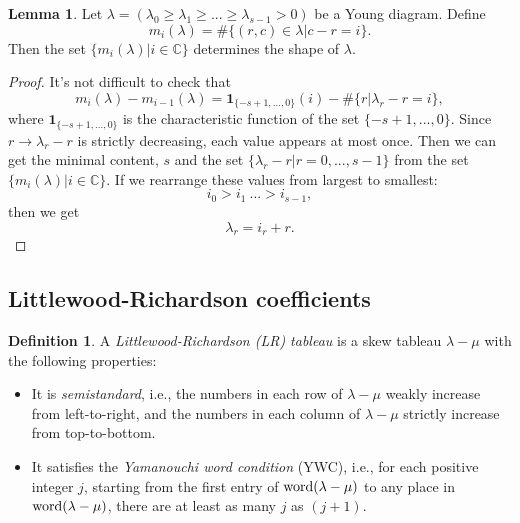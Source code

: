 \documentclass[11pt]{amsart}
\numberwithin{equation}{section}
\theoremstyle{definition}
\newtheorem{lemma}[thm]{Lemma}
\newtheorem{definition}[thm]{Definition}
\begin{document}
\begin{lemma}\label{lem multipicity of content determine a diagram}
Let $\lambda=(\lambda_0\geq\lambda_1\geq...\geq\lambda_{s-1}>0)$ be a Young diagram. Define
\begin{equation}
    m_i(\lambda)=\#\{(r,c)\in\lambda|c-r=i\}.
\end{equation}
 Then the set $\{m_{i}(\lambda)|i\in\mathbb{\mathbb{C}}\}$ determines the shape of $\lambda$.
\end{lemma}
\begin{proof}
    It's not difficult to check that
    \[
    m_i(\lambda)-m_{i-1}(\lambda)=\textbf{1}_{\{-s+1,...,0\}}(i)-\#\{r|\lambda_{r}-r=i\},
    \]
    where $\textbf{1}_{\{-s+1,...,0\}}$ is the characteristic function of the set $\{-s+1,...,0\}$. Since $r\rightarrow\lambda_r-r$ is strictly decreasing, each value appears at most once. Then we can get the minimal content, $s$ and the set $\{\lambda_r-r|r=0,...,s-1\}$ from the set $\{m_{i}(\lambda)|i\in\mathbb{C}\}$. If we rearrange these values from largest to smallest:
    \[
    i_0>i_1\>...>i_{s-1},
    \]
    then we get 
    \[
    \lambda_r=i_r+r.
    \]
\end{proof}

\subsection{Littlewood-Richardson coefficients}\label{Sec:LR coefficients}

\begin{definition}
A \emph{Littlewood-Richardson (LR) tableau} is a skew tableau $\lambda-\mu$ with the following
properties:
\begin{itemize}
    \item[(\romannumeral1)]  It is \emph{semistandard}, i.e., the numbers in each row of $\lambda-\mu$ weakly increase from left-to-right, and the numbers in each column of $\lambda-\mu$ strictly increase from top-to-bottom.
    \item[(\romannumeral2)] It satisfies the \emph{Yamanouchi word condition} (YWC), i.e., for each positive integer $j$, starting from the first entry of $\textnormal{word}(\lambda-\mu)$ to any place in $\textnormal{word}(\lambda-\mu)$, there are at least as many $j$ as $(j+1)$.
\end{itemize}
\end{definition}
\end{document}

